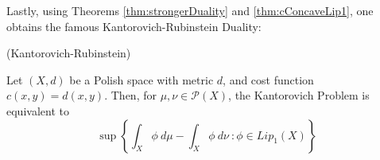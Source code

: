 Lastly, using  Theorems
\ref{thm:strongerDuality} and \ref{thm:cConcaveLip1}, one obtains the famous
Kantorovich-Rubinstein Duality:

\begin{theorem}(Kantorovich-Rubinstein)

  Let $(X,d)$ be a Polish space with metric $d$, and cost function $c(x,y) = d(x,y)$.
  Then, for $\mu, \nu \in \mathcal P(X)$, the Kantorovich Problem
  is equivalent to
  \begin{equation}
      \sup \left \{
      \int_X \phi \ d\mu - \int_X \phi \ d\nu \ :
      \phi \in Lip_1(X)
      \right \}
  \end{equation}
  \label{thm:Kantorovich-Rubinstein}
\end{theorem}
